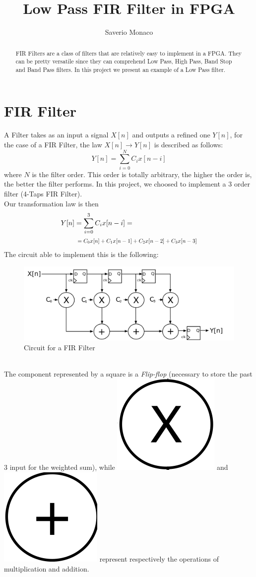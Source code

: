 \documentclass[11pt,a4paper,twocolumn]{IEEEtran}
\author{Saverio Monaco\\ \sepline}
\title{\textbf{Low Pass FIR Filter in FPGA}}
\newcommand*{\Scale}[2][4]{\scalebox{#1}{$#2$}}
\begin{document}
	\maketitle
	\begin{abstract}
		FIR Filters are a class of filters that are relatively easy to implement in a FPGA. They can be pretty versatile since they can comprehend Low Pass, High Pass, Band Stop and Band Pass filters. In this project we present an example of a Low Pass filter.
	\end{abstract}
	\section{FIR Filter}
	A Filter takes as an input a signal $X[n]$ and outputs a refined one $Y[n]$, for the case of a FIR Filter, the law $X[n]\to Y[n]$ is described as follows: 
	$$ Y[n] = \sum_{i=0}^N C_i x[n-i] $$
	where $N$ is the filter order. This order is totally arbitrary, the higher the order is, the better the filter performs. In this project, we choosed to implement a 3 order filter (4-Taps FIR Filter).\\ Our transformation law is then
	$$\begin{aligned} Y[n]&=\sum_{i=0}^3 C_ix[n-i]=\\ & \Scale[0.8]{\hspace*{.2cm}=C_0x[n]+C_1x[n-1]+C_2x[n-2]+C_3x[n-3]}\end{aligned}$$
	The circuit able to implement this is the following:
	\begin{figure}[h]
		\centering
		\includegraphics[width=1\linewidth]{img/FIR_direct_svg}
		\caption{Circuit for a FIR Filter}
	\end{figure}\\
	The component represented by a square is a \emph{Flip-flop} (necessary to store the past 3 input for the weighted sum), while \includegraphics[width=0.05\linewidth]{img/x} and \includegraphics[width=0.05\linewidth]{img/+} represent respectively the operations of multiplication and addition.\\
\end{document}
